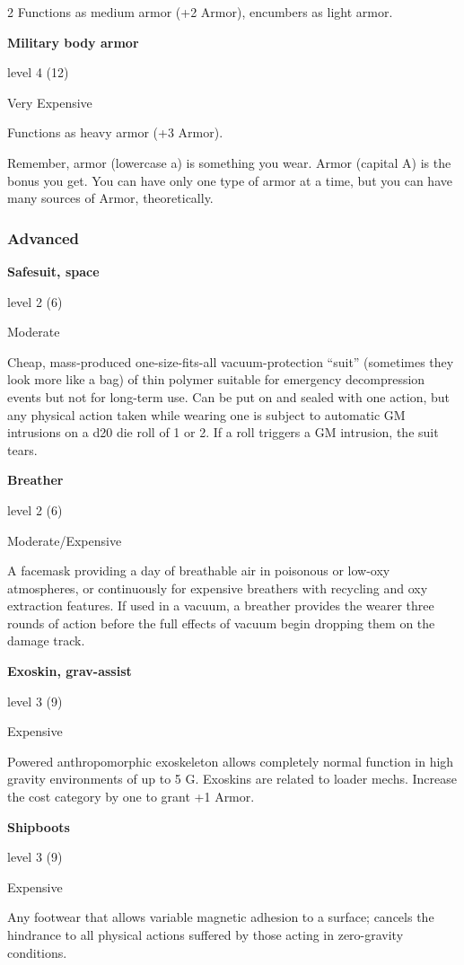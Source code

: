 \begin{multicols}{2}
Functions as medium armor (+2 Armor), encumbers as light armor. 

\textbf{Military body armor}

level 4 (12) 

Very Expensive 

Functions as heavy armor (+3 Armor).

Remember, armor (lowercase a) is something you wear. Armor (capital A) is the bonus you get. You can have only one type of armor at a time, but you can have many sources of Armor, theoretically.

\subsubsection{Advanced}

\textbf{Safesuit, space}

level 2 (6) 

Moderate 

Cheap, mass-produced one-size-fits-all vacuum-protection “suit” (sometimes they look more like a bag) of thin polymer suitable for emergency decompression events but not for long-term use. Can be put on and sealed with one action, but any physical action taken while wearing one is subject to automatic GM intrusions on a d20 die roll of 1 or 2. If a roll triggers a GM intrusion, the suit tears.

\textbf{Breather} 

level 2 (6) 

Moderate/Expensive 

A facemask providing a day of breathable air in poisonous or low-oxy atmospheres, or continuously for expensive breathers with recycling and oxy extraction features. If used in a vacuum, a breather provides the wearer three rounds of action before the full effects of vacuum begin dropping them on the damage track. 

\textbf{Exoskin, grav-assist}

level 3 (9) 

Expensive 

Powered anthropomorphic exoskeleton allows completely normal function in high gravity environments of up to 5 G. Exoskins are related to loader mechs. Increase the cost category by one to grant +1 Armor. 

\textbf{Shipboots} 

level 3 (9) 

Expensive 

Any footwear that allows variable magnetic adhesion to a surface; cancels the hindrance to all physical actions suffered by those acting in zero-gravity conditions. 


\end{multicols}
